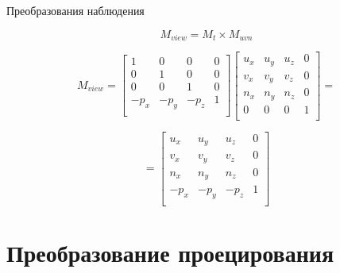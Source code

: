 \documentclass{beamer}
\begin{document}
	\begin{frame}{Преобразования наблюдения}

		\[
			M_{view} = M_{t} \times M_{uvn}
	 \]

	 \[
		 M_{view} = 
		 \begin{bmatrix}
			 1 & 0 & 0 & 0 \\
			 0 & 1 & 0 & 0 \\
			 0 & 0 & 1 & 0 \\
			 -p_x & -p_y & -p_z & 1 \\
		 \end{bmatrix}	
		 \begin{bmatrix}
			 u_x & u_y & u_z & 0 \\
			 v_x & v_y & v_z & 0 \\
			 n_x & n_y & n_z & 0 \\
			 0 & 0 & 0 & 1 \\
		 \end{bmatrix}	
		 =
	 \]

	 \[
		 =
		 \begin{bmatrix}
			 u_x & u_y & u_z & 0 \\
			 v_x & v_y & v_z & 0 \\
			 n_x & n_y & n_z & 0 \\
			 -p_x & -p_y & -p_z & 1 \\
		 \end{bmatrix}	
	 \]

	\end{frame}


	\section{Преобразование проецирования}
\end{document}
